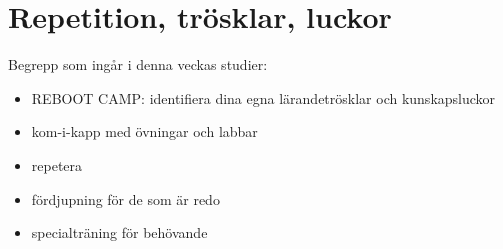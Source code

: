 \chapter{Repetition, trösklar, luckor}\label{chapter:W08}
Begrepp som ingår i denna veckas studier:
\begin{itemize}[noitemsep,label={$\square$},leftmargin=*]
\item REBOOT CAMP: identifiera dina egna lärandetrösklar och kunskapsluckor
\item kom-i-kapp med övningar och labbar
\item repetera
\item fördjupning för de som är redo
\item specialträning för behövande\end{itemize}
